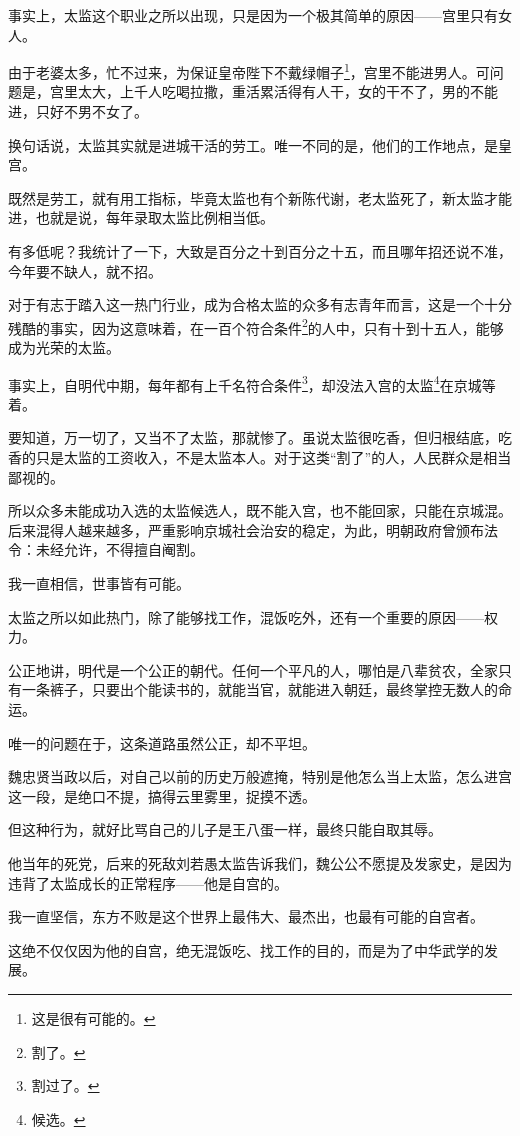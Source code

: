\begin{multicols}{\theparacolNo}
		事实上，太监这个职业之所以出现，只是因为一个极其简单的原因——宫里只有女人。

		由于老婆太多，忙不过来，为保证皇帝陛下不戴绿帽子\footnote{这是很有可能的。}，宫里不能进男人。可问题是，宫里太大，上千人吃喝拉撒，重活累活得有人干，女的干不了，男的不能进，只好不男不女了。

		换句话说，太监其实就是进城干活的劳工。唯一不同的是，他们的工作地点，是皇宫。

		既然是劳工，就有用工指标，毕竟太监也有个新陈代谢，老太监死了，新太监才能进，也就是说，每年录取太监比例相当低。

		有多低呢？我统计了一下，大致是百分之十到百分之十五，而且哪年招还说不准，今年要不缺人，就不招。

		对于有志于踏入这一热门行业，成为合格太监的众多有志青年而言，这是一个十分残酷的事实，因为这意味着，在一百个符合条件\footnote{割了。}的人中，只有十到十五人，能够成为光荣的太监。

		事实上，自明代中期，每年都有上千名符合条件\footnote{割过了。}，却没法入宫的太监\footnote{候选。}在京城等着。

		要知道，万一切了，又当不了太监，那就惨了。虽说太监很吃香，但归根结底，吃香的只是太监的工资收入，不是太监本人。对于这类“割了”的人，人民群众是相当鄙视的。

		所以众多未能成功入选的太监候选人，既不能入宫，也不能回家，只能在京城混。后来混得人越来越多，严重影响京城社会治安的稳定，为此，明朝政府曾颁布法令：未经允许，不得擅自阉割。

		我一直相信，世事皆有可能。

		太监之所以如此热门，除了能够找工作，混饭吃外，还有一个重要的原因——权力。

		公正地讲，明代是一个公正的朝代。任何一个平凡的人，哪怕是八辈贫农，全家只有一条裤子，只要出个能读书的，就能当官，就能进入朝廷，最终掌控无数人的命运。

		唯一的问题在于，这条道路虽然公正，却不平坦。

		魏忠贤当政以后，对自己以前的历史万般遮掩，特别是他怎么当上太监，怎么进宫这一段，是绝口不提，搞得云里雾里，捉摸不透。

		但这种行为，就好比骂自己的儿子是王八蛋一样，最终只能自取其辱。

		他当年的死党，后来的死敌刘若愚太监告诉我们，魏公公不愿提及发家史，是因为违背了太监成长的正常程序——他是自宫的。

		我一直坚信，东方不败是这个世界上最伟大、最杰出，也最有可能的自宫者。

		这绝不仅仅因为他的自宫，绝无混饭吃、找工作的目的，而是为了中华武学的发展。


\end{multicols}
